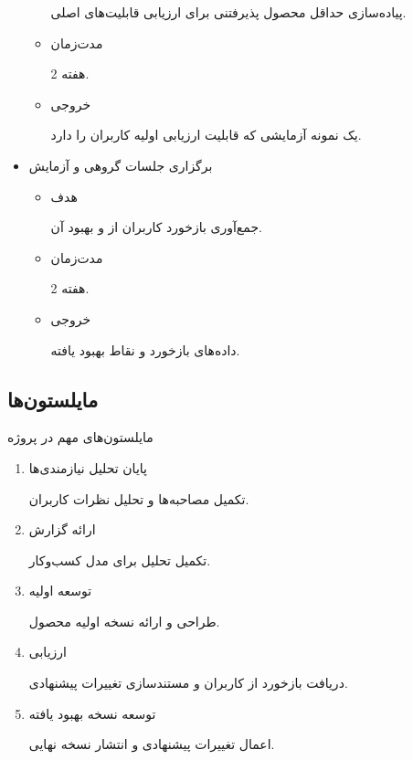 \documentclass[dvipsnames, svgnames, x11names, 11pt]{article}
\begin{document}
\begin{itemize}
\begin{itemize}
پیاده‌سازی حداقل محصول پذیرفتنی  برای ارزیابی قابلیت‌های اصلی.

\item 
مدت‌زمان

2 هفته.

\item 
خروجی

یک نمونه آزمایشی که قابلیت ارزیابی اولیه کاربران را دارد.
\end{itemize}

\item 
برگزاری جلسات گروهی و آزمایش 
\begin{itemize}
\item 
هدف

جمع‌آوری بازخورد کاربران از  و بهبود آن.

\item 
مدت‌زمان

2 هفته.

\item 
خروجی

داده‌های بازخورد و نقاط بهبود یافته.
\end{itemize}
\end{itemize}

\subsection{مایلستون‌ها}
مایلستون‌های مهم در پروژه
\begin{enumerate}
\item 
پایان تحلیل نیازمندی‌ها

تکمیل مصاحبه‌ها و تحلیل نظرات کاربران.

\item 
ارائه گزارش 

تکمیل تحلیل  برای مدل کسب‌وکار.

\item 
توسعه اولیه 

طراحی و ارائه نسخه اولیه محصول.

\item 
ارزیابی 

دریافت بازخورد از کاربران و مستندسازی تغییرات پیشنهادی.

\item 
توسعه نسخه بهبود یافته

اعمال تغییرات پیشنهادی و انتشار نسخه نهایی.
\end{enumerate}
\end{document}
